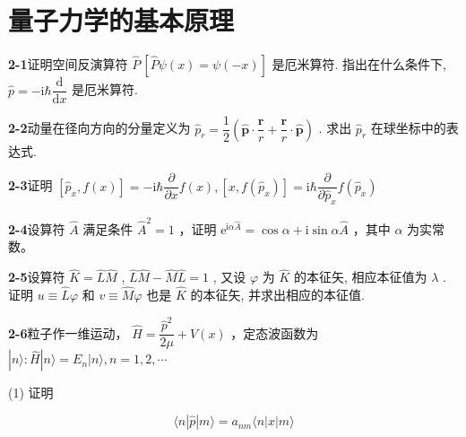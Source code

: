 \chapter{量子力学的基本原理}

\newpage


\textbf{2-1}\quad 证明空间反演算符 $\displaystyle \hat{P}\,[\hat{P}\psi(x)=\psi(-x)]$ 是厄米算符. 指出在什么条件下, $\displaystyle \hat{p}=-\mathrm{i}\hbar\dfrac{\mathrm{d}}{\mathrm{d}x}$ 是厄米算符.

\vfill

\newpage

\textbf{2-2}\quad 动量在径向方向的分量定义为 $\displaystyle \hat{p}_{r} = \dfrac{1}{2}\left(\hat{\pmb{p}}\cdot \dfrac{\pmb{r}}{r} + \dfrac{\pmb{r}}{r}\cdot \hat{\pmb{p}}\right)$ . 求出 $\displaystyle \hat{p}_{r}$ 在球坐标中的表达式.

\vfill

\newpage

\textbf{2-3}\quad 证明 $\displaystyle [\hat{p}_{x}, f(x)] = -\mathrm{i}\hbar \dfrac{\partial}{\partial x} f(x), [x, f(\hat{p}_{x})] = \mathrm{i}\hbar \dfrac{\partial}{\partial \hat{p}_{x}} f(\hat{p}_{x})$

\vfill

\newpage

\textbf{2-4}\quad 设算符 $\displaystyle \hat{A}$ 满足条件 $\displaystyle \hat{A}^{2} = 1$ ，证明 $\displaystyle \mathrm{e}^{\mathrm{i}\alpha \hat{A}} = \cos \alpha + \mathrm{i}\sin \alpha \hat{A}$ ，其中 $\displaystyle \alpha$ 为实常数。

\vfill

\newpage

\textbf{2-5}\quad 设算符 $\displaystyle \hat{K} = \hat{L}\hat{M}$ , $\displaystyle \hat{L}\hat{M} - \hat{M}\hat{L} = 1$ , 又设 $\displaystyle \varphi$ 为 $\displaystyle \hat{K}$ 的本征矢, 相应本征值为 $\displaystyle \lambda$ . 证明 $\displaystyle u \equiv \hat{L}\varphi$ 和 $\displaystyle v \equiv \hat{M}\varphi$ 也是 $\displaystyle \hat{K}$ 的本征矢, 并求出相应的本征值.

\vfill

\newpage

\textbf{2-6}\quad 粒子作一维运动， $\displaystyle \hat{H} = \dfrac{\hat{p}^{2}}{2\mu} + V(x)$ ，定态波函数为 $\displaystyle |n\rangle: \hat{H}|n\rangle = E_{n} |n\rangle, n = 1, 2, \cdots$

(1) 证明

\begin{equation}\tag{1}
\langle n | \hat{p} | m \rangle = a_{nm} \langle n | x | m \rangle
\end{equation}

